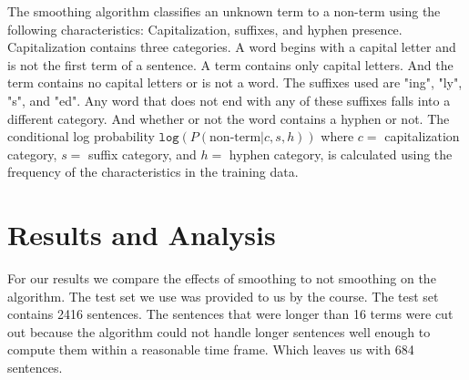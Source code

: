 \documentclass[11pt,twocolumn]{article}
\begin{document}
The smoothing algorithm classifies an unknown term to a non-term using the following characteristics: Capitalization, suffixes, and hyphen presence. 
Capitalization contains three categories. A word begins with a capital letter and is not the first term of a sentence. A term contains only capital letters. And the term contains no capital letters or is not a word.
The suffixes used are "ing", "ly", "s", and "ed". Any word that does not end with any of these suffixes falls into a different category.
And whether or not the word contains a hyphen or not.
The conditional log probability $\texttt{log}(P (\text{non-term} | c, s, h))$ where $c=$ capitalization category, $s=$ suffix category, and $h=$ hyphen category, is calculated using the frequency of the characteristics in the training data.





\section{Results and Analysis}
For our results we compare the effects of smoothing to not smoothing on the algorithm. The test set we use was provided to us by the course. The test set contains 2416 sentences. The sentences that were longer than 16 terms were cut out because the algorithm could not handle longer sentences well enough to compute them within a reasonable time frame. Which leaves us with 684 sentences.
\end{document}
